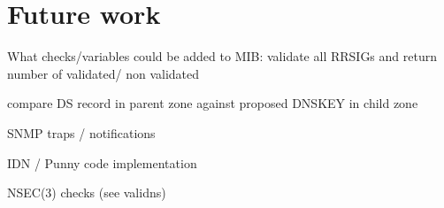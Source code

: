 \section{Future work}
\label{chap:future-work}
What checks/variables could be added to MIB:
validate all RRSIGs and return number of validated/ non validated

compare DS record in parent zone against proposed DNSKEY in child zone

SNMP traps / notifications

IDN / Punny code implementation

NSEC(3) checks (see validns)



